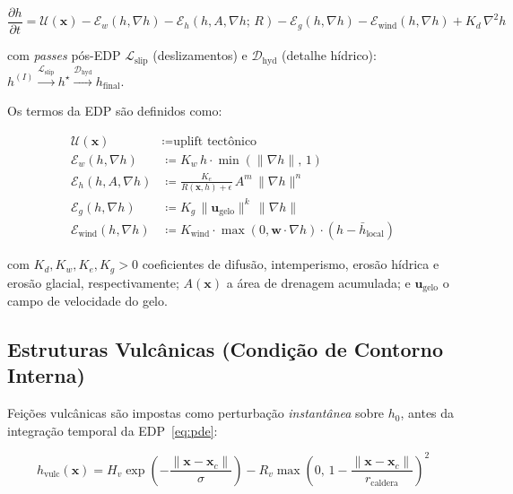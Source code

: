 \documentclass[11pt,a4paper]{article}
\begin{document}
\begin{equation}
  \frac{\partial h}{\partial t}
  = \mathcal{U}(\mathbf{x})
  - \mathcal{E}_w(h, \nabla h)
  - \mathcal{E}_h(h, A, \nabla h;\, R)
  - \mathcal{E}_g(h, \nabla h)
  - \mathcal{E}_{\text{wind}}(h, \nabla h)
  + K_d \,\nabla^2 h
  \label{eq:pde}
\end{equation}

com \emph{passes} pós-EDP $\mathcal{L}_{\text{slip}}$ (deslizamentos) e $\mathcal{D}_{\text{hyd}}$ (detalhe hídrico):
$h^{(I)} \xrightarrow{\mathcal{L}_{\text{slip}}} h^{\star} \xrightarrow{\mathcal{D}_{\text{hyd}}} h_{\text{final}}$.

Os termos da EDP são definidos como:

\begin{align}
  \mathcal{U}(\mathbf{x})      &\coloneqq \text{uplift tectônico} \label{eq:uplift}\\
  \mathcal{E}_w(h, \nabla h)   &\coloneqq K_w \, h \cdot \min\!\left(\|\nabla h\|,\, 1\right) \label{eq:weathering}\\
  \mathcal{E}_h(h, A, \nabla h) &\coloneqq \frac{K_e}{R(\mathbf{x}, h) + \epsilon} \, A^m \,\|\nabla h\|^n \label{eq:erosion}\\
  \mathcal{E}_g(h, \nabla h)   &\coloneqq K_g \,\|\mathbf{u}_{\text{gelo}}\|^k \,\|\nabla h\| \label{eq:glacial}\\
  \mathcal{E}_{\text{wind}}(h, \nabla h) &\coloneqq K_{\text{wind}} \cdot \max(0, \mathbf{w}\cdot\nabla h) \cdot (h - \bar{h}_{\text{local}}) \label{eq:wind}
\end{align}

com $K_d, K_w, K_e, K_g > 0$ coeficientes de difusão, intemperismo, erosão hídrica e erosão glacial,
respectivamente; $A(\mathbf{x})$ a área de drenagem acumulada; e $\mathbf{u}_{\text{gelo}}$ o campo de
velocidade do gelo.

\subsection{Estruturas Vulcânicas (Condição de Contorno Interna)}

Feições vulcânicas são impostas como perturbação \emph{instantânea} sobre $h_0$, antes da
integração temporal da EDP~\eqref{eq:pde}:

\begin{equation}
  h_{\text{vulc}}(\mathbf{x}) = H_v \exp\!\left(-\frac{\|\mathbf{x} - \mathbf{x}_c\|}{\sigma}\right)
  - R_v \max\!\left(0,\, 1 - \frac{\|\mathbf{x} - \mathbf{x}_c\|}{r_{\text{caldera}}}\right)^2
  \label{eq:volcanic}
\end{equation}
\end{document}
